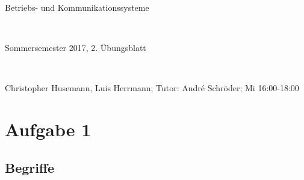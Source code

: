\documentclass[numbers=noendperiod]{scrartcl}
\begin{document}
	
\newcommand{\inputmintedframed}[2]{
	\begin{mdframed}[linecolor=bg,backgroundcolor=bg]
		\inputminted[mathescape,breaklines,linenos,numbersep=5pt,tabsize=3]{#1}{#2}
	\end{mdframed}}
	
\hrulefill
\begin{center}
	\bfseries %
	\sffamily %
	\begin{huge}
		Betriebs- und Kommunikationssysteme
	\end{huge}\\
	\begin{Large}
		Sommersemester 2017, 2. Übungsblatt
	\end{Large}\\
	\begin{small}
		Christopher Husemann, Luis Herrmann; Tutor: André Schröder; Mi 16:00-18:00
	\end{small}
	
	\vspace{-10pt}
\end{center}
\hrulefill

\section*{Aufgabe 1}
\subsection*{Begriffe}
\end{document}
